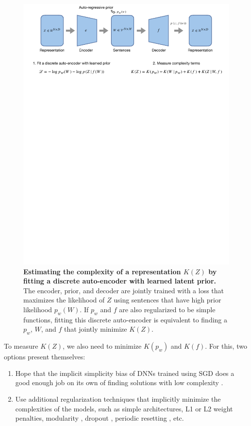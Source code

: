 \documentclass{article} %
\begin{document}
\begin{appendices}
\begin{figure}[ht]
    \centering
    \includegraphics[width=\linewidth]{figures/optimization.pdf}
    \caption{\textbf{Estimating the complexity of a representation $K(Z)$ by fitting a discrete auto-encoder with learned latent prior.} The encoder, prior, and decoder are jointly trained with a loss that maximizes the likelihood of $Z$ using sentences that have high prior likelihood $p_w(W)$. If $p_w$ and $f$ are also regularized to be simple functions, fitting this discrete auto-encoder is equivalent to finding a $p_w$, $W$, and $f$ that jointly minimize $K(Z)$.}
    \label{fig:optimization}
\end{figure}

To measure $K(Z)$, we also need to minimize $K(p_w)$ and $K(f)$. For this, two options present themselves:
\begin{enumerate}
    \item Hope that the implicit simplicity bias of DNNs trained using SGD does a good enough job on its own of finding solutions with low complexity \citep{blier2018description}.
    \item Use additional regularization techniques that implicitly minimize the complexities of the models, such as simple architectures, L1 or L2 weight penalties, modularity \citep{goyal2022inductive}, dropout \citep{hinton2012improving}, periodic resetting \cite{zhou2021fortuitous}, etc.
\end{enumerate}


\end{appendices}
\end{document}
